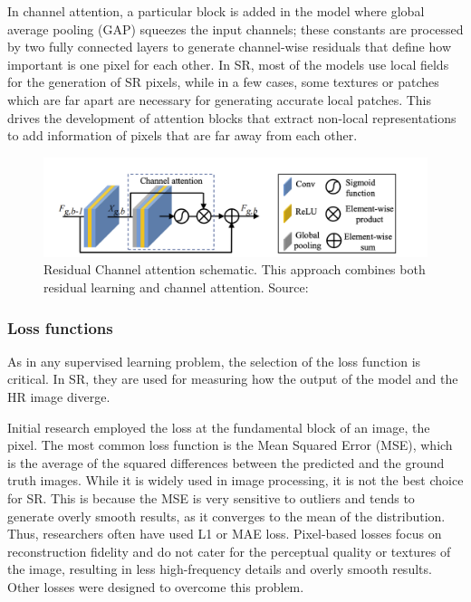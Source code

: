         In channel attention, a particular block is added in the model where global average pooling (GAP) squeezes the input channels; these constants are processed by two fully connected layers to generate channel-wise residuals that define how important is one pixel for each other.
        In SR, most of the models use local fields for the generation of SR pixels, while in a few cases, some textures or patches which are far apart are necessary for generating accurate local patches. This drives the development of attention blocks that extract non-local representations to add information of pixels that are far away from each other.

        \begin{figure}[H]
            \centering
            \includegraphics[width=\textwidth]{Includes/2-feature-attention.png}
            \caption{Residual Channel attention schematic. This approach combines both residual learning and channel attention.
             Source: \cite{zhang2018image}}
            \label{fig:2-feature-attention}
        \end{figure}

        \subsubsection{Loss functions}

        As in any supervised learning problem, the selection of the loss function is critical. In SR, they are used for measuring how the output of the model and the HR image diverge.
        
        Initial research employed the loss at the fundamental block of an image, the pixel.
        The most common loss function is the Mean Squared Error (MSE), which is the average of the squared differences between the predicted and the ground truth images.
        While it is widely used in image processing, it is not the best choice for SR.
        This is because the MSE is very sensitive to outliers and tends to generate overly smooth results, as it converges to the mean of the distribution. Thus, researchers often have used L1 or MAE loss.
        Pixel-based losses focus on reconstruction fidelity and do not cater for the perceptual quality or textures of the image, resulting in less high-frequency details and overly smooth results. Other losses were designed to overcome this problem.

